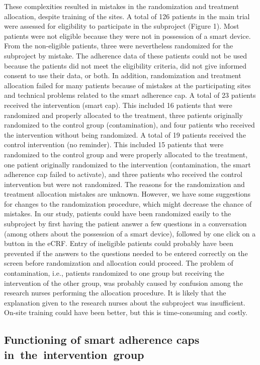 \documentclass[twocolumn, serif, empirical, authordate]{jote-article}
\begin{document}
 These complexities resulted in mistakes in the randomization and treatment allocation, despite training of the sites. A total of 126 patients in the main trial were assessed for eligibility to participate in the subproject (Figure 1). Most patients were not eligible because they were not in possession of a smart device. From the non-eligible patients, three were nevertheless randomized for the subproject by mistake. The adherence data of these patients could not be used because the patients did not meet the eligibility criteria, did not give informed consent to use their data, or both.
 In addition, randomization and treatment allocation failed for many patients because of mistakes at the participating sites and technical problems related to the smart adherence cap. A total of 23 patients received the intervention (smart cap). This included 16 patients that were randomized and properly allocated to the treatment, three patients originally randomized to the control group (contamination), and four patients who received the intervention without being randomized. A total of 19 patients received the control intervention (no reminder). This included 15 patients that were randomized to the control group and were properly allocated to the treatment, one patient originally randomized to the intervention (contamination, the smart adherence cap failed to activate), and three patients who received the control intervention but were not randomized.
 The reasons for the randomization and treatment allocation mistakes are unknown. However, we have some suggestions for changes to the randomization procedure, which might decrease the chance of mistakes. In our study, patients could have been randomized easily to the subproject by first having the patient answer a few questions in a conversation (among others about the possession of a smart device), followed by one click on a button in the eCRF. Entry of ineligible patients could probably have been prevented if the answers to the questions needed to be entered correctly on the screen before randomization and allocation could proceed.
 The problem of contamination, i.e., patients randomized to one group but receiving the intervention of the other group, was probably caused by confusion among the research nurses performing the allocation procedure.
It is likely that the explanation given to the research nurses about the subproject was insufficient. On-site training could have been better, but this is time-consuming and costly.


\subsection*{Functioning of smart adherence caps in~the~intervention~group}
\end{document}
